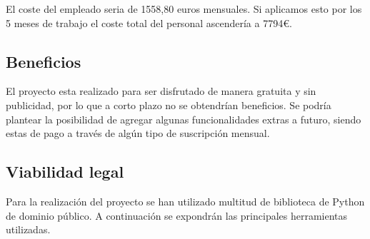 El coste del empleado seria de 1558,80 euros mensuales. Si aplicamos esto por los 5 meses de trabajo el coste total del personal ascendería a 7794€.

\subsection{Beneficios}
El proyecto esta realizado para ser disfrutado de manera gratuita y sin publicidad, por lo que a corto plazo no se obtendrían beneficios. Se podría plantear la posibilidad de agregar algunas funcionalidades extras a futuro, siendo estas de pago a través de algún tipo de suscripción mensual.

\subsection{Viabilidad legal}

Para la realización del proyecto se han utilizado multitud de biblioteca de Python de dominio público. A continuación se expondrán las principales herramientas utilizadas.


